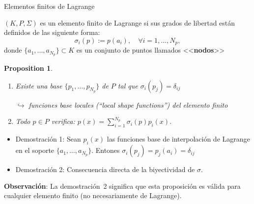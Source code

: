 \documentclass[10pt,leqno]{beamer}
\newcommand{\Np}{{N_p}}
\newtheorem{proposition}{Proposition}
\begin{document}
\begin{frame}{Elementos finitos de Lagrange}

  \begin{definition} $(K,P,\Sigma)$ es un \alert{elemento finito de
      Lagrange} si sus grados de libertad están definidos de las siguiente
    forma:
    $$
    \sigma_i(p) := p(a_i), \quad \forall i=1,...,\Np,
    $$
    donde $\{a_1,...,a_\Np\} \subset K$ es un conjunto de puntos
    llamados <<\textbf{nodos}>>
  \end{definition}

\begin{proposition}
  \begin{enumerate}
  \item Existe una base $\{p_1,...,p_\Np\}$ de $P$ tal que
    $\sigma_i(p_j)=\delta_{ij}$
    \begin{flushright} \scriptsize $\hookrightarrow$  \alert{funciones base} locales
      (``\textit{local shape functions}'') del elemento finito
    \end{flushright}
  \item Todo $p\in P$ verifica: $p(x)=\sum_{i=1}^\Np \sigma_i(p) p_i(x)$.
  \end{enumerate}
\end{proposition}

\begin{footnotesize}
  \begin{itemize}
  \item Demostración 1: Sean $p_i(x)$ las funciones base de
    interpolación de Lagrange en el soporte
    $\{a_1,\dots,a_\Np\}$. Entones
    $\sigma_i(p_j)=p_j(a_i)=\delta_{ij}$
  \item Demostración 2: Consecuencia directa de la biyectividad de $\sigma$.
  \end{itemize}
\end{footnotesize}

  \textbf{Observación}: La demostración~2 significa que \alert{esta proposición es válida para
  cualquier elemento finito} (no necesariamente de Lagrange).
\end{frame}
\end{document}
